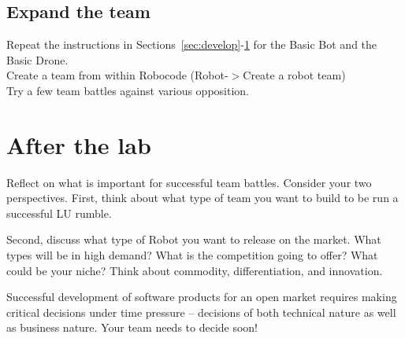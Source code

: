 \documentclass{scrreprt}
\begin{document}
\section{Expand the team} \label{sec:expand}
Repeat the instructions in Sections~\ref{sec:develop}-\ref{sec:expand} for the Basic Bot and the Basic Drone.\\
Create a team from within Robocode (Robot-$>$Create a robot team)\\
Try a few team battles against various opposition.

\chapter{After the lab}
Reflect on what is important for successful team battles. Consider your two perspectives. First, think about what type of team you want to build to be run a successful LU rumble.

Second, discuss what type of Robot you want to release on the market. What types will be in high demand? What is the competition going to offer? What could be your niche? Think about commodity, differentiation, and innovation.

Successful development of software products for an open market requires making critical decisions under time pressure -- decisions of both technical nature as well as business nature. Your team needs to decide soon!
\end{document}
